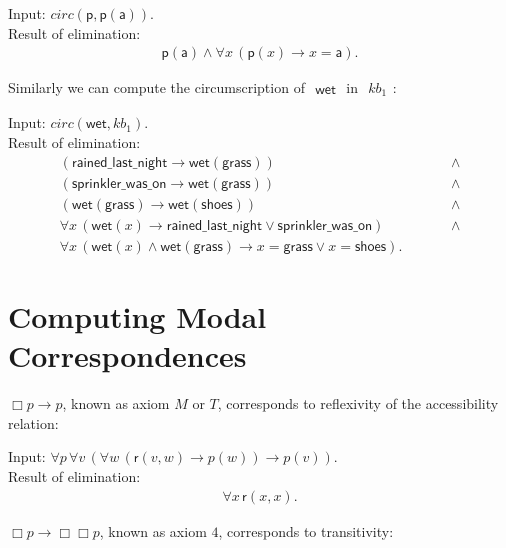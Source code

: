 \documentclass[a4paper]{article}
\newcommand{\imp}{\rightarrow}
\newcommand{\pplmacro}[1]{\mathit{#1}}
\begin{document}
\noindent Input: $\pplmacro{circ}(\mathsf{p},\mathsf{p}(\mathsf{a})).$\\
\noindent Result of elimination:
\[\begin{array}{lllll}
\mathsf{p}(\mathsf{a}) \land  \forall \mathit{x} \, (\mathsf{p}(\mathit{x}) \imp  \mathit{x}=\mathsf{a}).
\end{array}
\]
%
%
 \par\medskip\noindent Similarly we can compute the circumscription of
    $\begin{array}{l}
\mathsf{wet}
\end{array}
$ in $\begin{array}{l}
\pplmacro{kb_{1}}
\end{array}
$:\par\medskip

\noindent Input: $\pplmacro{circ}(\mathsf{wet},\pplmacro{kb_{1}}).$\\
\noindent Result of elimination:
\[\begin{array}{lllll}
(\mathsf{rained\_last\_night} \imp  \mathsf{wet}(\mathsf{grass})) &&&&\; \land \\
(\mathsf{sprinkler\_was\_on} \imp  \mathsf{wet}(\mathsf{grass})) &&&&\; \land \\
(\mathsf{wet}(\mathsf{grass}) \imp  \mathsf{wet}(\mathsf{shoes})) &&&&\; \land \\
\forall \mathit{x} \, (\mathsf{wet}(\mathit{x}) \imp  \mathsf{rained\_last\_night} \lor  \mathsf{sprinkler\_was\_on}) &&&&\; \land \\
\forall \mathit{x} \, (\mathsf{wet}(\mathit{x}) \land  \mathsf{wet}(\mathsf{grass}) \imp  \mathit{x}=\mathsf{grass} \lor  \mathit{x}=\mathsf{shoes}).
\end{array}
\]
%
%
  \section{Computing Modal Correspondences}  
%
%
 $\Box p \imp p$, known as axiom $M$ or $T$, corresponds to reflexivity of
   the accessibility relation:

\noindent Input: $\forall \mathit{p} \, \forall \mathit{v} \, (\forall \mathit{w} \, (\mathsf{r}(\mathit{v},\mathit{w}) \imp  \mathit{p}(\mathit{w})) \imp  \mathit{p}(\mathit{v})).$\\
\noindent Result of elimination:
\[\begin{array}{lllll}
\forall \mathit{x} \, \mathsf{r}(\mathit{x},\mathit{x}).
\end{array}
\]
%
%
\par\medskip\noindent
  $\Box p \imp \Box \Box p$, known as axiom $4$, corresponds to transitivity:
\end{document}
